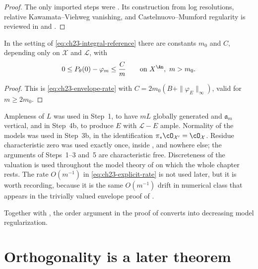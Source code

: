 \begin{proof}
The only imported steps were
.  Its construction from log
resolutions, relative Kawamata--Viehweg vanishing, and
Castelnuovo--Mumford regularity is reviewed in
 and
.
\end{proof}

\begin{corollary}
\label{cor:ch23-envelope-rate}
In the setting of \eqref{eq:ch23-integral-reference} there are constants
\(m_0\) and \(C\), depending only on \(\mathcal X\) and \(\mathcal L\), with
\begin{equation}\label{eq:ch23-explicit-rate}
 0\leq P_\theta(0)-\varphi_m\leq\frac{C}{m}
 \qquad\text{on }X^{\An},\ m>m_0 .
\end{equation}
\end{corollary}

\begin{proof}
This is \eqref{eq:ch23-envelope-rate} with
\(C=2m_0(B+\|\varphi_E\|_\infty)\), valid for \(m\geq2m_0\).
\end{proof}

\begin{remark}
\label{rem:ch23-base-ideal-hypotheses}
Ampleness of \(L\) was used in Step~1, to have \(mL\) globally generated and
\(\mathfrak a_m\) vertical, and in Step~4b, to produce \(E\) with
\(\mathcal L-E\) ample.  Normality of the models was used in Step~3b, in the
identification \(\pi_*\cO_{\mathcal X'}=\cO_{\mathcal X}\).  Residue
characteristic zero was used exactly once, inside
, and nowhere else; the arguments of
Steps~1--3 and~5 are characteristic free.  Discreteness of the valuation is
used throughout the model theory of  on which the
whole chapter rests.  The rate \(O(m^{-1})\) in
\eqref{eq:ch23-explicit-rate} is not used later, but it is worth recording,
because it is the same \(O(m^{-1})\) drift in numerical class that appears
in the trivially valued envelope proof of
.
\end{remark}

Together with , the order
argument in the proof of
 converts
 into decreasing model regularization.

\section{Orthogonality is a later theorem}

